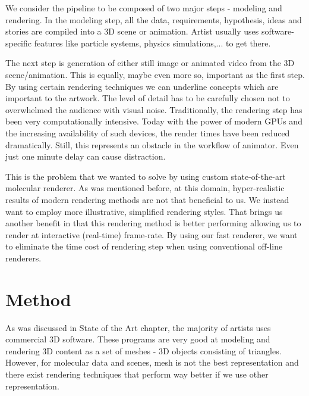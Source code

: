 \documentclass[
  digital, %
  table,   %
  nolof,     %
  nolot,     %
]{fithesis3}
\begin{document}
We consider the pipeline to be composed of two major steps - modeling and rendering. In the modeling step, all the data, requirements, hypothesis, ideas and stories are compiled into a 3D scene or animation. Artist usually uses software-specific features like particle systems, physics simulations,... to get there.

The next step is generation of either still image or animated video from the 3D scene/animation. This is equally, maybe even more so, important as the first step. By using certain rendering techniques we can underline concepts which are important to the artwork. The level of detail has to be carefully chosen not to overwhelmed the audience with visual noise. Traditionally, the rendering step has been very computationally intensive. Today with the power of modern GPUs and the increasing availability of such devices, the render times have been reduced dramatically. Still, this represents an obstacle in the workflow of animator. Even just one minute delay can cause distraction.

This is the problem that we wanted to solve by using custom state-of-the-art molecular renderer. As was mentioned before, at this domain, hyper-realistic results of modern rendering methods are not that beneficial to us. We instead want to employ more illustrative, simplified rendering styles. That brings us another benefit in that this rendering method is better performing allowing us to render at interactive (real-time) frame-rate. By using our fast renderer, we want to eliminate the time cost of rendering step when using conventional off-line renderers.

\chapter{Method}
\label{chap:method}

As was discussed in State of the Art chapter, the majority of artists uses commercial 3D software. These programs are very good at modeling and rendering 3D content as a set of meshes - 3D objects consisting of triangles. However, for molecular data and scenes, mesh is not the best representation and there exist rendering techniques that perform way better if we use other representation.
\end{document}
